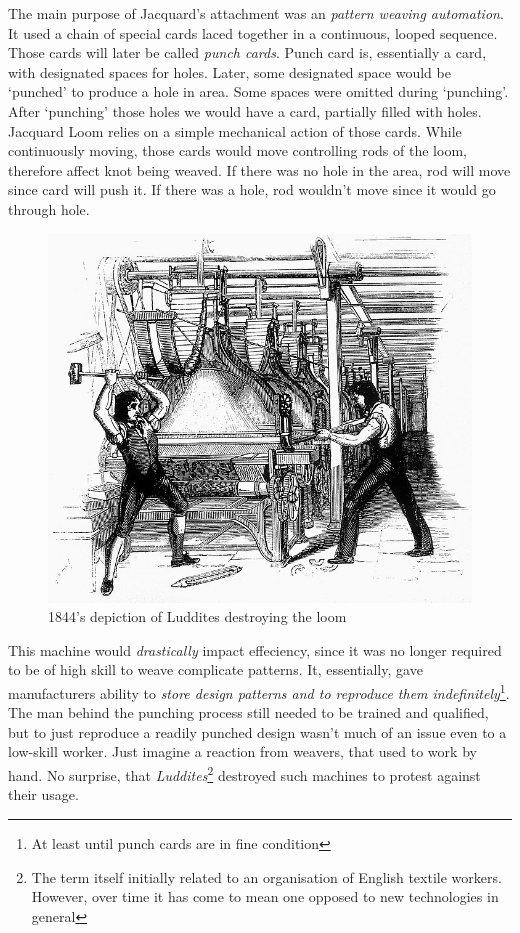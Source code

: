 \documentclass{article}
\begin{document}
            The main purpose of Jacquard's attachment was an \emph{pattern weaving automation}. It used a chain of special cards laced together in a continuous, looped sequence.
            Those cards will later be called \emph{punch cards}. Punch card is, essentially a card, with designated spaces for holes. Later, some designated space would be `punched'
            to produce a hole in area. Some spaces were omitted during `punching'. After `punching' those holes we would have a card, partially filled with holes. Jacquard Loom
            relies on a simple mechanical action of those cards. While continuously moving, those cards would move controlling rods of the loom, therefore affect knot being weaved. 
            If there was no hole in the area, rod will move since card will push it. If there was a hole, rod wouldn't move since it would go through hole. \par

            \begin{figure}
                \centering
                \includegraphics[scale=0.25]{images/misc/luddites.jpg}
                \caption{1844's depiction of Luddites destroying the loom}
            \end{figure}

            This machine would \emph{drastically} impact effeciency, since it was no longer required to be of high skill to weave complicate patterns. It, essentially, gave
            manufacturers ability to \emph{store design patterns and to reproduce them indefinitely}\footnote{At least until punch cards are in fine condition}. The man behind
            the punching process still needed to be trained and qualified, but to just reproduce a readily punched design wasn't much of an issue even to a low-skill worker.
            Just imagine a reaction from weavers, that used to work by hand. No surprise, that \emph{Luddites}\footnote{The term itself initially related to an organisation 
            of English textile workers. However, over time it has come to mean one opposed to new technologies in general}
            destroyed such machines to protest against their usage. \par
\end{document}
